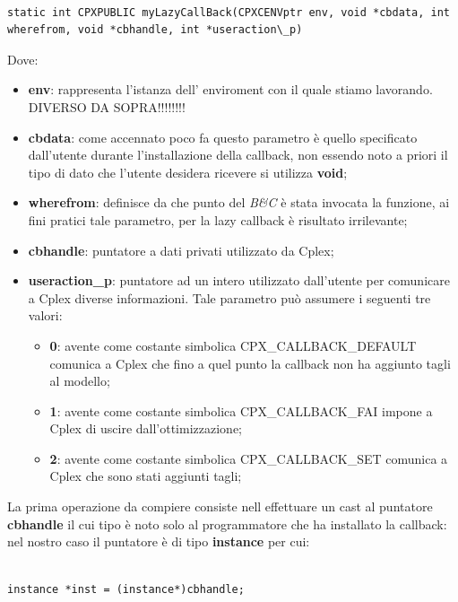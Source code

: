 \documentclass[11pt]{article}
\begin{document}
\begin{lstlisting}

static int CPXPUBLIC myLazyCallBack(CPXCENVptr env, void *cbdata, int wherefrom, void *cbhandle, int *useraction\_p)

\end{lstlisting}

Dove:

\begin{itemize}
    \item \textbf{env}: rappresenta l’istanza dell’ enviroment con il quale stiamo lavorando. DIVERSO DA SOPRA!!!!!!!!
    \item \textbf{cbdata}: come accennato poco fa questo parametro è quello specificato dall'utente durante l'installazione della callback, non essendo noto a priori il tipo di dato che l'utente desidera ricevere si utilizza \textbf{void};
    \item \textbf{wherefrom}: definisce da che punto del \textit{B\&C} è stata invocata la funzione, ai fini pratici tale parametro, per la lazy callback è risultato irrilevante;
    \item \textbf{cbhandle}: puntatore a dati privati utilizzato da Cplex;
    \item \textbf{useraction\_p}: puntatore ad un intero utilizzato dall'utente per comunicare a Cplex diverse informazioni. Tale parametro può assumere i seguenti tre valori:
    \begin{itemize}
    \item \textbf{0}: avente come costante simbolica CPX\_CALLBACK\_DEFAULT comunica a Cplex che fino a quel punto la callback non ha aggiunto tagli al modello;
    \item \textbf{1}: avente come costante simbolica CPX\_CALLBACK\_FAI impone a Cplex di uscire dall'ottimizzazione;
    \item \textbf{2}: avente come costante simbolica CPX\_CALLBACK\_SET comunica a Cplex che sono stati aggiunti tagli;
    \end{itemize}

\end{itemize}

La prima operazione da compiere consiste nell effettuare un cast al puntatore \textbf{cbhandle} il cui tipo è noto solo al programmatore che ha installato la callback: nel nostro caso il puntatore è di tipo \textbf{instance} per cui:


\begin{lstlisting}

instance *inst = (instance*)cbhandle;

\end{lstlisting}
\end{document}
